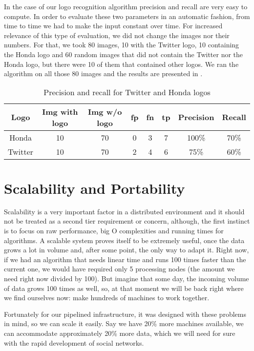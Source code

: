 In the case of our logo recognition algorithm precision and recall are very
easy to compute. In order to evaluate these two parameters in an automatic
fashion, from time to time we had to make the input constant over time. For
increased relevance of this type of evaluation, we did not change the images
nor their numbers. For that, we took 80 images, 10 with the Twitter logo, 10
containing the Honda logo and 60 random images that did not contain the
Twitter nor the Honda logo, but there were 10 of them that contained other
logos. We ran the algorithm on all those 80 images and the results are
presented in .

\begin{center}
\begin{table}[htb]
\centering
  \caption{Precision and recall for Twitter and Honda logos}
  \begin{tabular}{cccccccc}
    \toprule
    Logo & Img with logo & Img w/o logo & fp &
    fn & tp & Precision & Recall \\
    \midrule
    Honda & 10 & 70 & 0 & 3 & 7 & 100\% & 70\% \\
    \midrule
    Twitter & 10 & 70 & 2 & 4 & 6 & 75\% & 60\% \\
    \bottomrule
  \end{tabular}
  \label{table:prec-rec}
\end{table}
\end{center}

\section{Scalability and Portability}

Scalability is a very important factor in a distributed environment and
it should not be treated as a second tier requirement or concern, although, the
first instinct is to focus on raw performance, big O complexities and running
times for algorithms. A scalable system proves itself to be extremely useful,
once the data grows a lot in volume and, after some point, the only way to
adapt it. Right now, if we had an algorithm that needs linear time and runs
100 times faster than the current one, we would have required only 5 processing nodes
(the amount we need right now divided by 100). But imagine that some day, the incoming volume
of data grows 100 times as well, so, at that moment we will be back right where we find
ourselves now: make hundreds of machines to work together.

Fortunately for our pipelined infrastructure, it was designed with these
problems in mind, so we can scale it easily. Say we have 20\% more machines
available, we can accommodate approximately 20\% more data, which we will need
for sure with the rapid development of social networks.

